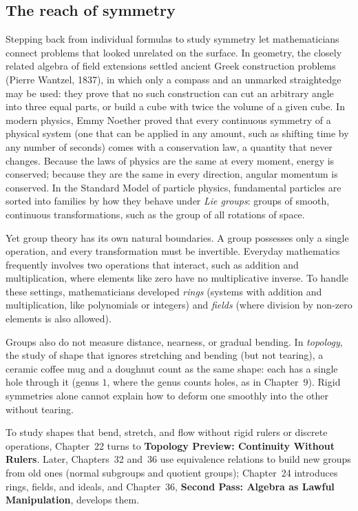 \subsection{The reach of symmetry}

Stepping back from individual formulas to study symmetry let mathematicians connect problems that looked unrelated on the surface. In geometry, the closely related algebra of field extensions settled ancient Greek construction problems (Pierre Wantzel, 1837), in which only a compass and an unmarked straightedge may be used: they prove that no such construction can cut an arbitrary angle into three equal parts, or build a cube with twice the volume of a given cube. In modern physics, Emmy Noether proved that every continuous symmetry of a physical system (one that can be applied in any amount, such as shifting time by any number of seconds) comes with a conservation law, a quantity that never changes. Because the laws of physics are the same at every moment, energy is conserved; because they are the same in every direction, angular momentum is conserved. In the Standard Model of particle physics, fundamental particles are sorted into families by how they behave under \emph{Lie groups}: groups of smooth, continuous transformations, such as the group of all rotations of space.

Yet group theory has its own natural boundaries. A group possesses only a single operation, and every transformation must be invertible. Everyday mathematics frequently involves two operations that interact, such as addition and multiplication, where elements like zero have no multiplicative inverse. To handle these settings, mathematicians developed \emph{rings} (systems with addition and multiplication, like polynomials or integers) and \emph{fields} (where division by non-zero elements is also allowed).

Groups also do not measure distance, nearness, or gradual bending. In \emph{topology}, the study of shape that ignores stretching and bending (but not tearing), a ceramic coffee mug and a doughnut count as the same shape: each has a single hole through it (genus $1$, where the genus counts holes, as in Chapter~9). Rigid symmetries alone cannot explain how to deform one smoothly into the other without tearing.

To study shapes that bend, stretch, and flow without rigid rulers or discrete operations, Chapter~22 turns to \textbf{Topology Preview: Continuity Without Rulers}. Later, Chapters~32 and~36 use equivalence relations to build new groups from old ones (normal subgroups and quotient groups); Chapter~24 introduces rings, fields, and ideals, and Chapter~36, \textbf{Second Pass: Algebra as Lawful Manipulation}, develops them.

